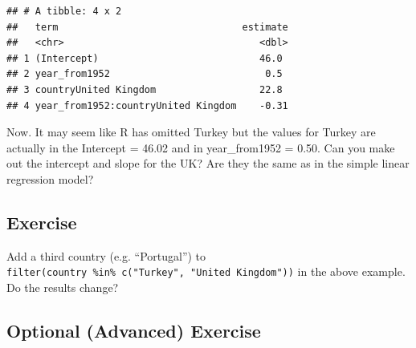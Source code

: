 \documentclass[]{book}
\makeatletter
\newenvironment{Shaded}{\begin{snugshade}}{\end{snugshade}}
\newcommand{\DataTypeTok}[1]{\textcolor[rgb]{0.13,0.29,0.53}{#1}}
\newcommand{\DecValTok}[1]{\textcolor[rgb]{0.00,0.00,0.81}{#1}}
\newcommand{\KeywordTok}[1]{\textcolor[rgb]{0.13,0.29,0.53}{\textbf{#1}}}
\newcommand{\NormalTok}[1]{#1}
\newcommand{\OperatorTok}[1]{\textcolor[rgb]{0.81,0.36,0.00}{\textbf{#1}}}
\newcommand{\StringTok}[1]{\textcolor[rgb]{0.31,0.60,0.02}{#1}}
\newenvironment{kframe}{%
\medskip{}
\setlength{\fboxsep}{.8em}
 \def\at@end@of@kframe{}%
 \ifinner\ifhmode%
  \def\at@end@of@kframe{\end{minipage}}%
  \begin{minipage}{\columnwidth}%
 \fi\fi%
 \def\FrameCommand##1{\hskip\@totalleftmargin \hskip-\fboxsep
 \colorbox{shadecolor}{##1}\hskip-\fboxsep
     \hskip-\linewidth \hskip-\@totalleftmargin \hskip\columnwidth}%
 \MakeFramed {\advance\hsize-\width
   \@totalleftmargin\z@ \linewidth\hsize
   \@setminipage}}%
 {\par\unskip\endMakeFramed%
 \at@end@of@kframe}
\renewenvironment{Shaded}{\begin{kframe}}{\end{kframe}}
\theoremstyle{definition}
\theoremstyle{definition}
\theoremstyle{definition}
\theoremstyle{remark}
\makeatother
\begin{document}
\begin{Shaded}
\end{Shaded}

\begin{verbatim}
## # A tibble: 4 x 2
##   term                                estimate
##   <chr>                                  <dbl>
## 1 (Intercept)                            46.0 
## 2 year_from1952                           0.5 
## 3 countryUnited Kingdom                  22.8 
## 4 year_from1952:countryUnited Kingdom    -0.31
\end{verbatim}

Now. It may seem like R has omitted Turkey but the values for Turkey are
actually in the Intercept = 46.02 and in year\_from1952 = 0.50. Can you
make out the intercept and slope for the UK? Are they the same as in the
simple linear regression model?

\hypertarget{exercise-34}{%
\subsection{Exercise}\label{exercise-34}}

Add a third country (e.g. ``Portugal'') to
\texttt{filter(country\ \%in\%\ c("Turkey",\ "United\ Kingdom"))} in the
above example. Do the results change?

\hypertarget{optional-advanced-exercise-1}{%
\subsection{Optional (Advanced)
Exercise}\label{optional-advanced-exercise-1}}
\end{document}

